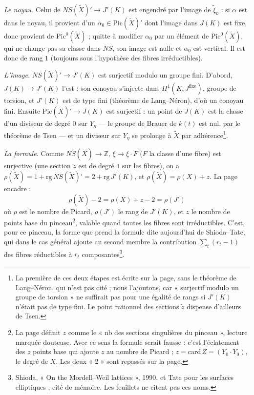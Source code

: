 \documentclass[11pt,a4paper]{article}
\begin{document}
\emph{Le noyau.} Celui de $NS(\tilde X)' \to J'(K)$ est engendré par
l'image de $\tilde\xi_0$ : si $\alpha$ est dans le noyau, il provient
d'un $\alpha_0 \in \mathrm{Pic}(\tilde X)'$ dont l'image dans $J(K)$ est
fixe, donc provient de $\mathrm{Pic}^0(\tilde X)$ ; quitte à modifier
$\alpha_0$ par un élément de $\mathrm{Pic}^0(\tilde X)$, qui ne change pas
sa classe dans $NS$, son image est nulle et $\alpha_0$ est vertical. Il est
donc de rang $1$ (toujours sous l'hypothèse des fibres irréductibles).

\emph{L'image.} $NS(\tilde X)' \to J'(K)$ est surjectif modulo un
groupe fini. D'abord, $J(K) \to J'(K)$ l'est : son conoyau s'injecte dans
$H^1(K, J^{\mathrm{fixe}})$, groupe de torsion, et $J'(K)$ est de type fini
(théorème de Lang–Néron), d'où un conoyau fini. Ensuite
$\mathrm{Pic}(\tilde X)' \to J(K)$ est surjectif : un point de $J(K)$ est
la classe d'un diviseur de degré $0$ sur $Y_\eta$ — le groupe de Brauer de
$k(t)$ est nul, par le théorème de Tsen — et un diviseur sur $Y_\eta$ se
prolonge à $\tilde X$ par adhérence\footnote{La première de ces deux
étapes est écrite sur la page, sans le théorème de Lang–Néron, qui
n'est pas cité ; nous l'ajoutons, car « surjectif modulo un groupe de
torsion » ne suffirait pas pour une égalité de rangs si $J'(K)$
n'était pas de type fini. Le point rationnel des sections $\tilde z$
dispense d'ailleurs de Tsen.}.

\emph{La formule.} Comme $NS(\tilde X) \to \mathbb{Z}$,
$\xi \mapsto \xi \cdot F$ ($F$ la classe d'une fibre) est surjective (une
section $\tilde z$ est de degré $1$ sur les fibres), on a
$\rho(\tilde X) = 1 + \mathrm{rg}\, NS(\tilde X)' = 2 + \mathrm{rg}\, J'(K)$,
et $\rho(\tilde X) = \rho(X) + z$. La page encadre :
\[
  \boxed{\ \rho(\tilde X) - 2 = \rho(X) + z - 2 = \rho(J')\ }
\]
où $\rho$ est le nombre de Picard, $\rho(J')$ le rang de $J'(K)$, et $z$ le
nombre de points base du pinceau\footnote{La page définit $z$ comme le
« nb des sections singulières du pinceau », lecture marquée douteuse. Avec
ce sens la formule serait fausse : c'est l'éclatement des $z$ points base
qui ajoute $z$ au nombre de Picard ; $z = \mathrm{card}\,Z = (Y_0 \cdot
Y_0)$, le degré de $X$. Les deux « 2 » sont repassés sur la page.},
valable quand toutes les fibres sont irréductibles. C'est, pour ce
pinceau, la forme que prend la formule dite aujourd'hui de Shioda–Tate,
qui dans le cas général ajoute au second membre la contribution
$\sum_t (r_t - 1)$ des fibres réductibles à $r_t$
composantes\footnote{Shioda, « On the Mordell–Weil lattices », 1990, et
Tate pour les surfaces elliptiques ; cité de mémoire. Les feuillets ne
citent pas ces noms.}.
\end{document}
